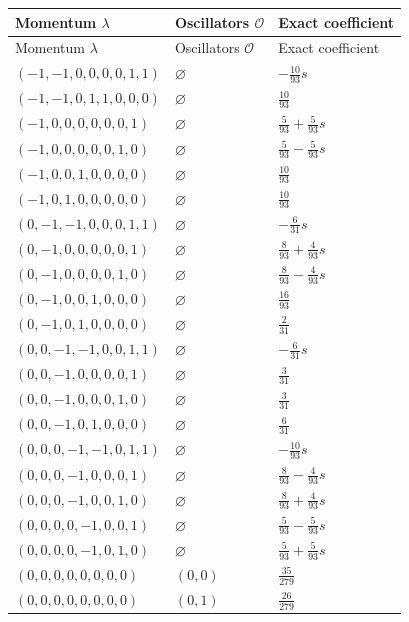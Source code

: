 \begingroup\scriptsize
\setlength{\tabcolsep}{5pt}
\begin{longtable}{@{}lll@{}}
\toprule
Momentum $\lambda$ & Oscillators $\mathcal O$ & Exact coefficient\\
\midrule\endfirsthead
\toprule
Momentum $\lambda$ & Oscillators $\mathcal O$ & Exact coefficient\\
\midrule\endhead
\bottomrule\endfoot
$(-1,-1,0,0,0,0,1,1)$ & $\varnothing$ & $-\frac{10}{93}s$\\
$(-1,-1,0,1,1,0,0,0)$ & $\varnothing$ & $\frac{10}{93}$\\
$(-1,0,0,0,0,0,0,1)$ & $\varnothing$ & $\frac{5}{93}+\frac{5}{93}s$\\
$(-1,0,0,0,0,0,1,0)$ & $\varnothing$ & $\frac{5}{93}-\frac{5}{93}s$\\
$(-1,0,0,1,0,0,0,0)$ & $\varnothing$ & $\frac{10}{93}$\\
$(-1,0,1,0,0,0,0,0)$ & $\varnothing$ & $\frac{10}{93}$\\
$(0,-1,-1,0,0,0,1,1)$ & $\varnothing$ & $-\frac{6}{31}s$\\
$(0,-1,0,0,0,0,0,1)$ & $\varnothing$ & $\frac{8}{93}+\frac{4}{93}s$\\
$(0,-1,0,0,0,0,1,0)$ & $\varnothing$ & $\frac{8}{93}-\frac{4}{93}s$\\
$(0,-1,0,0,1,0,0,0)$ & $\varnothing$ & $\frac{16}{93}$\\
$(0,-1,0,1,0,0,0,0)$ & $\varnothing$ & $\frac{2}{31}$\\
$(0,0,-1,-1,0,0,1,1)$ & $\varnothing$ & $-\frac{6}{31}s$\\
$(0,0,-1,0,0,0,0,1)$ & $\varnothing$ & $\frac{3}{31}$\\
$(0,0,-1,0,0,0,1,0)$ & $\varnothing$ & $\frac{3}{31}$\\
$(0,0,-1,0,1,0,0,0)$ & $\varnothing$ & $\frac{6}{31}$\\
$(0,0,0,-1,-1,0,1,1)$ & $\varnothing$ & $-\frac{10}{93}s$\\
$(0,0,0,-1,0,0,0,1)$ & $\varnothing$ & $\frac{8}{93}-\frac{4}{93}s$\\
$(0,0,0,-1,0,0,1,0)$ & $\varnothing$ & $\frac{8}{93}+\frac{4}{93}s$\\
$(0,0,0,0,-1,0,0,1)$ & $\varnothing$ & $\frac{5}{93}-\frac{5}{93}s$\\
$(0,0,0,0,-1,0,1,0)$ & $\varnothing$ & $\frac{5}{93}+\frac{5}{93}s$\\
$(0,0,0,0,0,0,0,0)$ & $(0,0)$ & $\frac{35}{279}$\\
$(0,0,0,0,0,0,0,0)$ & $(0,1)$ & $\frac{26}{279}$\\

\end{longtable}
